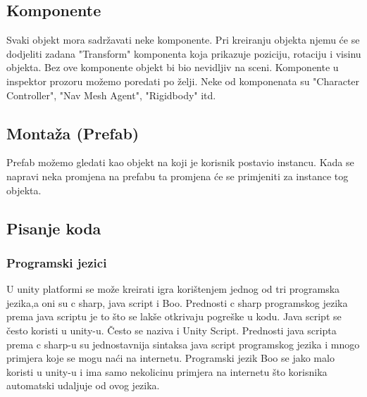 \subsection{Komponente}
Svaki objekt mora sadržavati neke komponente. Pri kreiranju objekta njemu će se dodjeliti zadana "Transform" komponenta koja prikazuje poziciju, rotaciju i visinu objekta. Bez ove komponente objekt bi bio nevidljiv na sceni. Komponente u inspektor prozoru možemo poredati po želji. Neke od komponenata su "Character Controller", "Nav Mesh Agent", "Rigidbody" itd.


\subsection{Montaža (Prefab)}
Prefab možemo gledati kao objekt na koji je korisnik postavio instancu. Kada se napravi neka promjena na prefabu ta promjena će se primjeniti za instance tog objekta.

\subsection{Pisanje koda}
\subsubsection{Programski jezici}
U unity platformi se može kreirati igra korištenjem jednog od tri programska jezika,a oni su c sharp, java script i Boo. Prednosti c sharp programskog jezika prema java scriptu je to što se lakše otkrivaju pogreške u kodu. Java script se često koristi u unity-u. Često se naziva i Unity Script. Prednosti java scripta prema c sharp-u su jednostavnija sintaksa java script programskog jezika i mnogo primjera koje se mogu naći na internetu. Programski jezik Boo se jako malo koristi u unity-u i ima samo nekolicinu primjera na internetu što korisnika automatski udaljuje od ovog jezika. 


